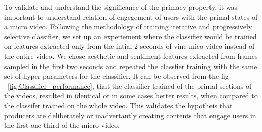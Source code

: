 To validate and understand the significance of the primacy property, it was important to understand relation of engegement of users with the primal states of a micro video. Following the methodology of training iterative and progressively selective classifier, we set up an experiement where the classifier would be trained on features extracted only from the intial 2 seconds of vine mico video instead of the entire video. We chose aesthetic and sentiment features extracted from frames sampled in the first two seconds and repeated the classfier training with the same set of hyper parameters for the classifier. It can be observed from the fig ~\ref{fig:Classifier_performance}, that the classifier trained of the primal sections of the videos, resulted in identical or in some cases better results, when compared to the classifer trained on the whole video. This validates the hypotheis that producers are deliberately or inadvertantly creating contents that engage users in the first one third of the micro video. 

